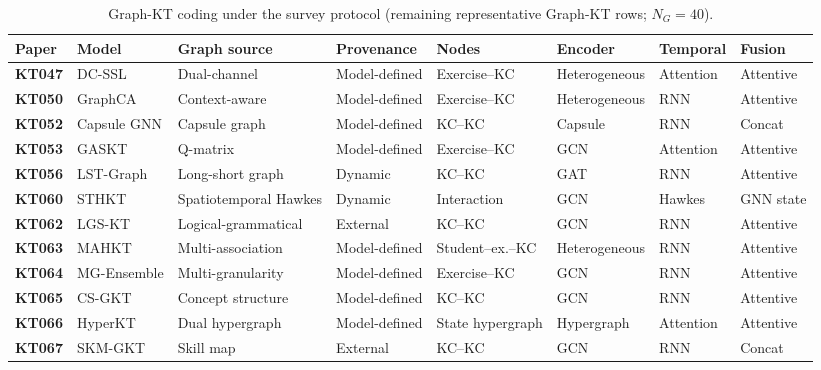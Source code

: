 \documentclass[lettersize,journal]{IEEEtran}
\begin{document}
\begin{table}[t]
\caption{Graph-KT coding under the survey protocol (remaining representative Graph-KT rows; $N_G=40$).}
\label{tab:graph_taxonomy_b}
\centering
\footnotesize
\setlength{\tabcolsep}{3.5pt}
\begin{tabular}{@{}ll>{\raggedright\arraybackslash}p{2.15cm}l>{\raggedright\arraybackslash}p{1.55cm}lll@{}}
\toprule
\textbf{Paper} & \textbf{Model} & \textbf{Graph source} & \textbf{Provenance} & \textbf{Nodes} & \textbf{Encoder} & \textbf{Temporal} & \textbf{Fusion} \\
\midrule
\textbf{KT047} & DC-SSL \cite{KT047_DCSSL_2023} & Dual-channel & Model-defined & Exercise--KC & Heterogeneous & Attention & Attentive \\
\textbf{KT050} & GraphCA \cite{KT050_GraphCA_2023} & Context-aware & Model-defined & Exercise--KC & Heterogeneous & RNN & Attentive \\
\textbf{KT052} & Capsule GNN \cite{KT052_CapsuleGNN_2022} & Capsule graph & Model-defined & KC--KC & Capsule & RNN & Concat \\
\textbf{KT053} & GASKT \cite{KT053_GASKT_2021} & Q-matrix & Model-defined & Exercise--KC & GCN & Attention & Attentive \\
\textbf{KT056} & LST-Graph \cite{KT056_LSTGraph_2025} & Long-short graph & Dynamic & KC--KC & GAT & RNN & Attentive \\
\textbf{KT060} & STHKT \cite{KT060_STHKT_2025} & Spatiotemporal Hawkes & Dynamic & Interaction & GCN & Hawkes & GNN state \\
\textbf{KT062} & LGS-KT \cite{KT062_LGSKT_2025} & Logical-grammatical & External & KC--KC & GCN & RNN & Attentive \\
\textbf{KT063} & MAHKT \cite{KT063_MAHKT_2025} & Multi-association & Model-defined & Student--ex.--KC & Heterogeneous & RNN & Attentive \\
\textbf{KT064} & MG-Ensemble \cite{KT064_MGEnsemble_2025} & Multi-granularity & Model-defined & Exercise--KC & GCN & RNN & Attentive \\
\textbf{KT065} & CS-GKT \cite{KT065_CSGKT_2025} & Concept structure & Model-defined & KC--KC & GCN & RNN & Attentive \\
\textbf{KT066} & HyperKT \cite{KT066_HyperKT_2025} & Dual hypergraph & Model-defined & State hypergraph & Hypergraph & Attention & Attentive \\
\textbf{KT067} & SKM-GKT \cite{KT067_SKMGKT_2025} & Skill map & External & KC--KC & GCN & RNN & Concat \\

\end{tabular}
\end{table}
\end{document}
